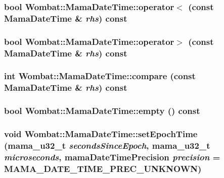 \label{classWombat_1_1MamaDateTime_a7f8ea791ba3ad83e644700a8ffe8451e}
\hypertarget{classWombat_1_1MamaDateTime_a4d3504dac7104377f71e9b1cce308688}{
\subsubsection[{operator$<$}]{\setlength{\rightskip}{0pt plus 5cm}bool Wombat::MamaDateTime::operator$<$ (const {\bf MamaDateTime} \& {\em rhs}) const}}
\label{classWombat_1_1MamaDateTime_a4d3504dac7104377f71e9b1cce308688}
\hypertarget{classWombat_1_1MamaDateTime_a53b4e2adb4c5c97a9b0fde3199848694}{
\subsubsection[{operator$>$}]{\setlength{\rightskip}{0pt plus 5cm}bool Wombat::MamaDateTime::operator$>$ (const {\bf MamaDateTime} \& {\em rhs}) const}}
\label{classWombat_1_1MamaDateTime_a53b4e2adb4c5c97a9b0fde3199848694}
\hypertarget{classWombat_1_1MamaDateTime_a3b3685ec4ce83d445a4dd3c50719ea19}{
\subsubsection[{compare}]{\setlength{\rightskip}{0pt plus 5cm}int Wombat::MamaDateTime::compare (const {\bf MamaDateTime} \& {\em rhs}) const}}
\label{classWombat_1_1MamaDateTime_a3b3685ec4ce83d445a4dd3c50719ea19}
\hypertarget{classWombat_1_1MamaDateTime_adaf5774adbf80a17c7e5da8850b7af08}{
\subsubsection[{empty}]{\setlength{\rightskip}{0pt plus 5cm}bool Wombat::MamaDateTime::empty () const}}
\label{classWombat_1_1MamaDateTime_adaf5774adbf80a17c7e5da8850b7af08}
\hypertarget{classWombat_1_1MamaDateTime_a11526c02ff3b37ce8e6678d176219cc8}{
\subsubsection[{setEpochTime}]{\setlength{\rightskip}{0pt plus 5cm}void Wombat::MamaDateTime::setEpochTime (mama\_\-u32\_\-t {\em secondsSinceEpoch}, \/  mama\_\-u32\_\-t {\em microseconds}, \/  mamaDateTimePrecision {\em precision} = {\ttfamily MAMA\_\-DATE\_\-TIME\_\-PREC\_\-UNKNOWN})}}
